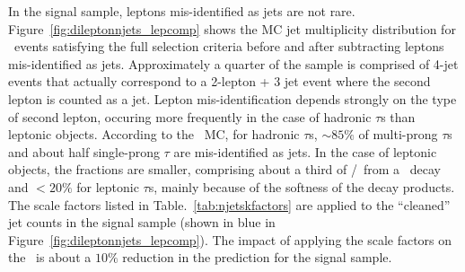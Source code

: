In the signal sample, leptons mis-identified as jets are not rare. 
Figure~\ref{fig:dileptonnjets_lepcomp}  shows the MC jet
multiplicity distribution for \ttll\ events satisfying the full
selection criteria before and after subtracting leptons mis-identified
as jets. Approximately a quarter of the sample is comprised of 4-jet
events that actually correspond to a 2-lepton + 3 jet event where the second
lepton is counted as a jet. Lepton mis-identification depends strongly
on the type of second lepton, occuring more frequently in the case of
hadronic $\tau$s than leptonic objects. According to the \ttll\
MC, for hadronic $\tau$s, $\sim85\%$ of multi-prong $\tau$s and about half
single-prong $\tau$ are mis-identified as jets. In the case of
leptonic objects, the fractions are smaller, comprising about a third
of \E/\M\ from a \W\ decay and $<20\%$ for leptonic $\tau$s, 
mainly because of the softness of the decay products. 
The scale factors listed in Table.~\ref{tab:njetskfactors} are applied
to the ``cleaned'' jet counts in the signal sample (shown in blue in
Figure~\ref{fig:dileptonnjets_lepcomp}). The impact of applying the
scale factors on the \ttll\ is about a $10\%$ reduction in the
prediction for the signal sample. 


